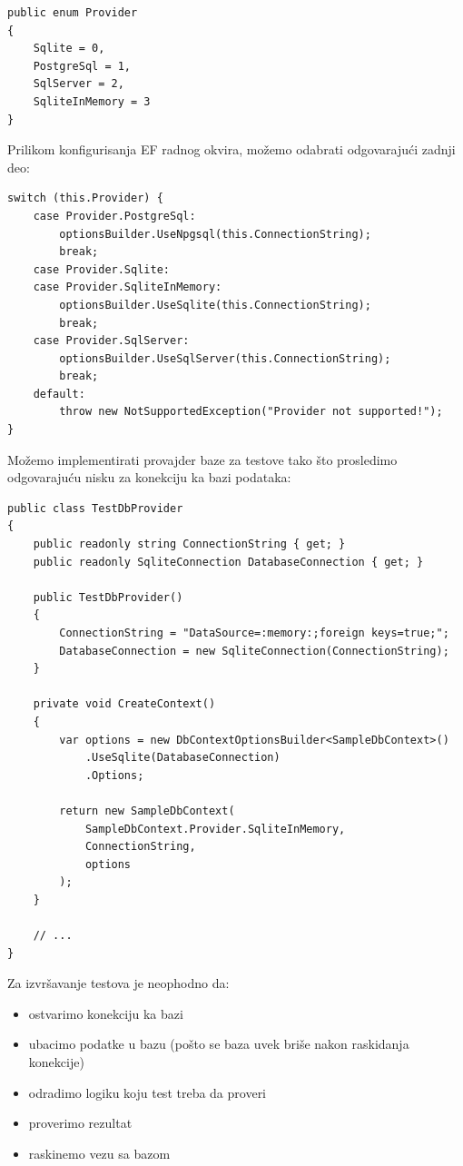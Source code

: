 \begin{verbatim}
public enum Provider
{
    Sqlite = 0,
    PostgreSql = 1,
    SqlServer = 2,
    SqliteInMemory = 3
}
\end{verbatim}

Prilikom konfigurisanja EF radnog okvira, možemo odabrati odgovarajući zadnji deo:

\begin{verbatim}
switch (this.Provider) {
    case Provider.PostgreSql:
        optionsBuilder.UseNpgsql(this.ConnectionString);
        break;
    case Provider.Sqlite:
    case Provider.SqliteInMemory:
        optionsBuilder.UseSqlite(this.ConnectionString);
        break;
    case Provider.SqlServer:
        optionsBuilder.UseSqlServer(this.ConnectionString);
        break;
    default:
        throw new NotSupportedException("Provider not supported!");
}
\end{verbatim}

Možemo implementirati provajder baze za testove tako što prosledimo odgovarajuću nisku za konekciju ka bazi podataka:

\begin{verbatim}
public class TestDbProvider
{
    public readonly string ConnectionString { get; }
    public readonly SqliteConnection DatabaseConnection { get; }

    public TestDbProvider()
    {
        ConnectionString = "DataSource=:memory:;foreign keys=true;";
        DatabaseConnection = new SqliteConnection(ConnectionString);
    }

    private void CreateContext()
    {
        var options = new DbContextOptionsBuilder<SampleDbContext>()
            .UseSqlite(DatabaseConnection)
            .Options;

        return new SampleDbContext(
            SampleDbContext.Provider.SqliteInMemory,
            ConnectionString,
            options
        );
    }

    // ...
}
\end{verbatim}

Za izvršavanje testova je neophodno da:

\begin{itemize}
\tightlist
\item
  ostvarimo konekciju ka bazi
\item
  ubacimo podatke u bazu (pošto se baza uvek briše nakon raskidanja konekcije)
\item
  odradimo logiku koju test treba da proveri
\item
  proverimo rezultat
\item
  raskinemo vezu sa bazom
\end{itemize}

